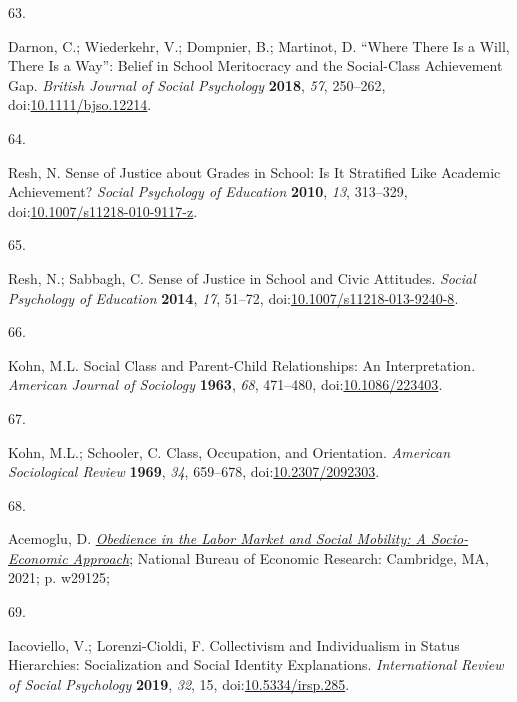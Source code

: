 \documentclass[
  12pt,
  letterpaper,
]{article}
\newlength{\cslhangindent}
\newlength{\csllabelwidth}
\newenvironment{CSLReferences}[2] %
 {\begin{list}{}{%
  \setlength{\itemindent}{0pt}
  \setlength{\leftmargin}{0pt}
  \setlength{\parsep}{0pt}
  \ifodd #1
   \setlength{\leftmargin}{\cslhangindent}
   \setlength{\itemindent}{-1\cslhangindent}
  \fi
  \setlength{\itemsep}{#2\baselineskip}}}
 {\end{list}}
\newcommand{\CSLLeftMargin}[1]{\parbox[t]{\csllabelwidth}{\strut#1\strut}}
\newcommand{\CSLRightInline}[1]{\parbox[t]{\linewidth - \csllabelwidth}{\strut#1\strut}}
\begin{document}
\begin{CSLReferences}{0}{0}
\CSLLeftMargin{63. }%
\CSLRightInline{Darnon, C.; Wiederkehr, V.; Dompnier, B.; Martinot, D.
{``{Where} There Is a Will, There Is a Way''}: {Belief} in School
Meritocracy and the Social-Class Achievement Gap. \emph{British Journal
of Social Psychology} \textbf{2018}, \emph{57}, 250--262,
doi:\href{https://doi.org/10.1111/bjso.12214}{10.1111/bjso.12214}.}

\CSLLeftMargin{64. }%
\CSLRightInline{Resh, N. Sense of Justice about Grades in School: Is It
Stratified Like Academic Achievement? \emph{Social Psychology of
Education} \textbf{2010}, \emph{13}, 313--329,
doi:\href{https://doi.org/10.1007/s11218-010-9117-z}{10.1007/s11218-010-9117-z}.}

\CSLLeftMargin{65. }%
\CSLRightInline{Resh, N.; Sabbagh, C. Sense of Justice in School and
Civic Attitudes. \emph{Social Psychology of Education} \textbf{2014},
\emph{17}, 51--72,
doi:\href{https://doi.org/10.1007/s11218-013-9240-8}{10.1007/s11218-013-9240-8}.}

\CSLLeftMargin{66. }%
\CSLRightInline{Kohn, M.L. Social {Class} and {Parent-Child
Relationships}: {An Interpretation}. \emph{American Journal of
Sociology} \textbf{1963}, \emph{68}, 471--480,
doi:\href{https://doi.org/10.1086/223403}{10.1086/223403}.}

\CSLLeftMargin{67. }%
\CSLRightInline{Kohn, M.L.; Schooler, C. Class, {Occupation}, and
{Orientation}. \emph{American Sociological Review} \textbf{1969},
\emph{34}, 659--678,
doi:\href{https://doi.org/10.2307/2092303}{10.2307/2092303}.}

\CSLLeftMargin{68. }%
\CSLRightInline{Acemoglu, D.
\emph{\href{https://doi.org/10.3386/w29125}{Obedience in the {Labor
Market} and {Social Mobility}: {A Socio-Economic Approach}}}; National
Bureau of Economic Research: Cambridge, MA, 2021; p. w29125;}

\CSLLeftMargin{69. }%
\CSLRightInline{Iacoviello, V.; Lorenzi-Cioldi, F. Collectivism and
{Individualism} in {Status Hierarchies}: {Socialization} and {Social
Identity Explanations}. \emph{International Review of Social Psychology}
\textbf{2019}, \emph{32}, 15,
doi:\href{https://doi.org/10.5334/irsp.285}{10.5334/irsp.285}.}


\end{CSLReferences}
\end{document}
